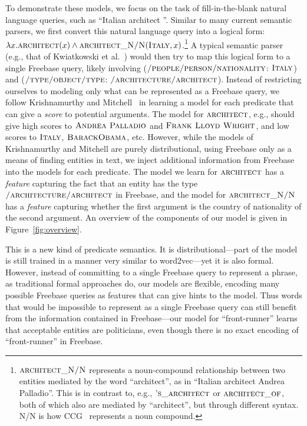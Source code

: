 \documentclass[11pt]{article}
\newcommand{\figref}[1]{Figure~\ref{fig:#1}}
\newcommand{\blank}{\underline{\hspace{.5cm}}}
\newcommand{\predicate}[1]{\ensuremath{\textsc{#1}}}
\newcommand{\entity}[1]{\ensuremath{\textsc{#1}}}
\begin{document}
To demonstrate these models, we focus on the task of fill-in-the-blank natural
language queries, such as ``Italian architect \blank{}''.  Similar to many
current semantic parsers, we first convert this natural language query into a
logical form: $\lambda x. \predicate{architect}(x) \land
\predicate{architect\_N/N}(\entity{Italy},
x)$.\footnote{\predicate{architect\_N/N} represents a noun-compound
relationship between two entities mediated by the word ``architect'', as in
``Italian architect Andrea Palladio''.  This is in contrast to, e.g.,
\predicate{'s\_architect} or \predicate{architect\_of}, both of which also are
mediated by ``architect'', but through different syntax.  N/N is how
CCG~\cite{steedman-2006-ccg} represents a noun compound.} A typical semantic
parser (e.g., that of Kwiatkowski et
al.~) would then try to map this
logical form to a single Freebase query, likely involving
(\predicate{/people/person/nationality}: \entity{Italy}) and
(\predicate{/type/object/type}: \entity{/architecture/architect}).  Instead of
restricting ourselves to modeling only what can be represented as a Freebase
query, we follow Krishnamurthy and
Mitchell~ in learning a
model for each predicate that can give a \emph{score} to potential arguments.
The model for \predicate{architect}, e.g., should give high scores to
\entity{Andrea Palladio} and \entity{Frank Lloyd Wright}, and low scores to
\entity{Italy}, \entity{BarackObama}, etc.  However, while the models of
Krishnamurthy and Mitchell are purely distributional, using Freebase only as a
means of finding entities in text, we inject additional information from
Freebase into the models for each predicate.  The model we learn for
\predicate{architect} has a \emph{feature} capturing the fact that an entity
has the type \entity{/architecture/architect} in Freebase, and the model for
\predicate{architect\_N/N} has a \emph{feature} capturing whether the first
argument is the country of nationality of the second argument.  An overview of
the components of our model is given in \figref{overview}.

This is a new kind of predicate semantics.  It is distributional---part of the
model is still trained in a manner very similar to word2vec---yet it is also
formal.  However, instead of committing to a single Freebase query to represent
a phrase, as traditional formal approaches do, our models are flexible,
encoding many possible Freebase queries as features that can give hints to the
model.  Thus words that would be impossible to represent as a single Freebase
query can still benefit from the information contained in Freebase---our model
for ``front-runner'' learns that acceptable entities are politicians, even
though there is no exact encoding of ``front-runner'' in Freebase.
\end{document}
